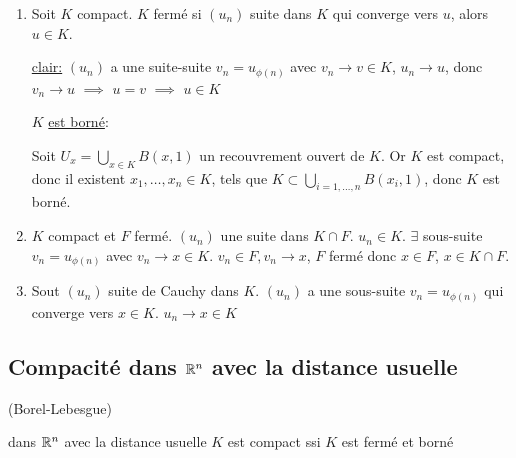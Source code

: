 \begin{preuve}
   \begin{enumerate}
       \item Soit $K$ compact.  $K$ fermé si  $(u_n)$ suite dans  $K$ qui converge vers  $u$, alors  $u \in K$.
           \par
           \underline{clair:}  $(u_n)$ a une suite-suite  $v_n = u_{\phi(n)}$ avec $v_n \to v \in K$, $u_n \to u$, donc $v_n \to u$ $\implies$ $u = v$  $\implies$ $u \in K$
           \par
           $K$ \underline{est borné}:
           \par
              Soit $U_x = \bigcup_{x \in K} B(x, 1)$ un recouvrement ouvert de $K$. Or  $K$ est compact, donc il existent  $x_1, \ldots, x_n \in K$, tels que $K \subset \bigcup_{i = 1, \ldots, n} B(x_i, 1) $, donc $K$ est borné.
        \item $K$ compact et $F$ fermé. $(u_n)$ une suite dans $K \cap F$. $u_n \in K$. $ \exists$ sous-suite $v_n = u_{\phi(n)}$ avec $v_n \to x \in K$. $v_n \in F, v_n \to x$, $F$ fermé donc $x \in F$, $x \in K \cap F$.
        \item Sout $(u_n)$ suite de Cauchy dans $K$. $(u_n)$ a une sous-suite $v_n = u_ { \phi(n)}$ qui converge vers $x \in K$. $u_n \to x \in K$
   \end{enumerate} 
\end{preuve}

\subsection{Compacité dans $\mathbb{R}^n$ avec la distance usuelle}
\begin{theorem}
    (Borel-Lebesgue)
    \par
    dans $\mathbb{R}^n$ avec la distance usuelle $K$ est compact ssi  $K$ est fermé et borné
\end{theorem}

